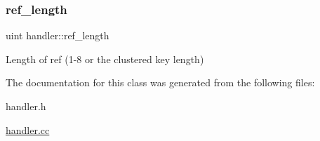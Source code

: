 \subsubsection{\texorpdfstring{ref\+\_\+length}{ref\_length}}
{\footnotesize\ttfamily uint handler\+::ref\+\_\+length}

Length of ref (1-\/8 or the clustered key length) 

The documentation for this class was generated from the following files\+:\begin{DoxyCompactItemize}
\item 
handler.\+h\item 
\mbox{\hyperlink{handler_8cc}{handler.\+cc}}\end{DoxyCompactItemize}
